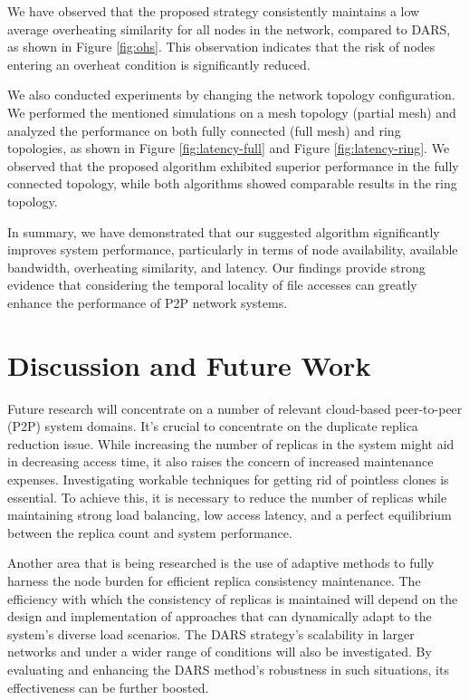 \documentclass[10pt, conference]{IEEEtran}
\begin{document}
We have observed that the proposed strategy consistently maintains a low average overheating similarity for all nodes in the network, compared to DARS, as shown in Figure \ref{fig:ohs}. This observation indicates that the risk of nodes entering an overheat condition is significantly reduced.

We also conducted experiments by changing the network topology configuration. We performed the mentioned simulations on a mesh topology (partial mesh) and analyzed the performance on both fully connected (full mesh) and ring topologies, as shown in Figure \ref{fig:latency-full} and Figure \ref{fig:latency-ring}. We observed that the proposed algorithm exhibited superior performance in the fully connected topology, while both algorithms showed comparable results in the ring topology.

In summary, we have demonstrated that our suggested algorithm significantly improves system performance, particularly in terms of node availability, available bandwidth, overheating similarity, and latency. Our findings provide strong evidence that considering the temporal locality of file accesses can greatly enhance the performance of P2P network systems.



\section{Discussion and Future Work}\label{sec:future}
Future research will concentrate on a number of relevant cloud-based peer-to-peer (P2P) system domains. It's crucial to concentrate on the duplicate replica reduction issue. While increasing the number of replicas in the system might aid in decreasing access time, it also raises the concern of increased maintenance expenses. Investigating workable techniques for getting rid of pointless clones is essential. To achieve this, it is necessary to reduce the number of replicas while maintaining strong load balancing, low access latency, and a perfect equilibrium between the replica count and system performance.

Another area that is being researched is the use of adaptive methods to fully harness the node burden for efficient replica consistency maintenance. The efficiency with which the consistency of replicas is maintained will depend on the design and implementation of approaches that can dynamically adapt to the system's diverse load scenarios. The DARS strategy's scalability in larger networks and under a wider range of conditions will also be investigated. By evaluating and enhancing the DARS method's robustness in such situations, its effectiveness can be further boosted.
\end{document}
